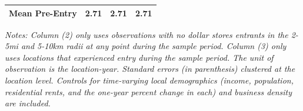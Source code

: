 \begin{table}[ht]
{\begin{threeparttable}
\begin{tabular}{l*{3}{c}}
Mean Pre-Entry  &     2.71         &     2.71        &     2.71         \\
\hline\hline
\end{tabular}

\begin{tablenotes}[flushleft]
\small 
\item \textit{Notes: Column (2) only uses observations with no dollar stores entrants in the 2-5mi and 5-10km radii at any point during the sample period. Column (3) only uses locations that experienced entry during the sample period. The unit of observation is the location-year. Standard errors (in parenthesis) clustered at the location level. Controls for time-varying local demographics (income, population, residential rents, and the one-year percent change in each) and business density are included. }
\end{tablenotes}
\end{threeparttable}
}
\end{table}
